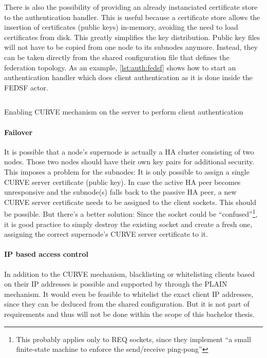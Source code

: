 There is also the possibility of providing an already instanciated certificate
store to the authentication handler. This is useful because a certificate store
allows the insertion of certificates (public keys) in-memory, avoiding the need
to load certificates from disk. This greatly simplifies the key distribution.
Public key files will not have to be copied from one node to its subnodes
anymore. Instead, they can be taken directly from the shared configuration file
that defines the federation topology. As an example, \autoref{lst:auth:fedsf}
shows how to start an authentication handler which does client authentication
as it is done inside the FEDSF actor.

\begin{listing}
	\inputminted[bgcolor=bg]{Ruby}{listings/auth/fedsf.rb}
	\caption{Enabling CURVE mechanism on the server to perform client authentication}
	\label{lst:auth:fedsf}
\end{listing}

\paragraph{Failover}\label{sec:approach:encryption:ha}
It is possible that a node's supernode is actually a HA cluster consisting of
two nodes. Those two nodes should have their own key pairs for additional
security. This imposes a problem for the subnodes: It is only possible to assign
a single CURVE server certificate (public key). In case the active HA peer becomes
unresponsive and the subnode(s) falls back to the passive HA peer, a new CURVE
server certificate needs to be assigned to the client sockets. This should be
possible. But there's a better solution:
Since the socket could be \cite[Binary Star Implementation, Binary Star client
in C]{zmq:zguide} ``confused''\footnote{This probably applies only to REQ
sockets, since they implement \cite[Client-Side Reliability (Lazy Pirate
Pattern)]{zmq:zguide} ``a small finite-state machine to enforce the
send/receive ping-pong''}, it is good practice to simply destroy the existing
socket and create a fresh one, assigning the correct supernode's CURVE server
certificate to it.

\paragraph{IP based access control}
In addition to the CURVE mechanism, blacklisting or whitelisting clients based
on their \gls{IP} addresses is possible and supported by
 through the PLAIN mechanism. It would even be
feasible to whitelist the exact client IP addresses, since they can be deduced
from the shared configuration. But it is not part of requirements and thus will not
be done within the scope of this bachelor thesis.

